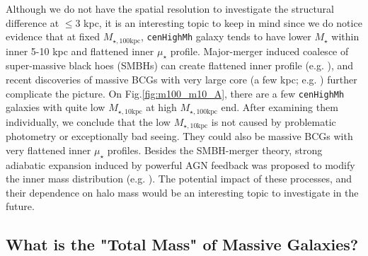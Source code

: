 \documentclass{emulateapj}
\def\rbcg{\texttt{cenHighMh}}
\def\mstar{{$M_{\star}$}}
\def\minn{{$M_{\star,10\mathrm{kpc}}$}}
\def\mtot{{$M_{\star,100\mathrm{kpc}}$}}
\def\mden{{$\mu_{\star}$}}
\newcommand{\update}[1]{\textcolor{Bittersweet}{#1}}
\begin{document}
\begin{CJK*}{UTF8}{gbsn}
    \update{
    Although we do not have the spatial resolution to investigate the structural 
    difference at $\leq 3$ kpc, it is an interesting topic to keep in mind since we do 
    notice evidence that at fixed \mtot{}, \rbcg{} galaxy tends to have lower \mstar{} 
    within inner 5-10 kpc and flattened inner \mden{} profile. 
    }
    Major-merger induced coalesce of super-massive black hoes (SMBHs) can create flattened 
    inner profile (e.g. \citealt{Milosavljevi2002}), and recent discoveries of massive 
    BCGs with very large core (a few kpc; e.g. \citealt{Postman2012, LopezCruz2014}) 
    further complicate the picture.
    On Fig.\ref{fig:m100_m10_A}, there are a few \rbcg{} galaxies with quite low 
    \minn{} at high \mtot{} end. 
    After examining them individually, we conclude that the low \minn{} is not caused 
    by problematic photometry or exceptionally bad seeing. 
    They could also be massive BCGs with very flattened inner \mden{} profiles.  
    Besides the SMBH-merger theory, strong adiabatic expansion induced by powerful AGN 
    feedback was proposed to modify the inner mass distribution (e.g. \citealt{Fan2008}). 
    The potential impact of these processes, and their dependence on halo mass would be 
    an interesting topic to investigate in the future.

 
\subsection{What is the "Total Mass" of Massive Galaxies?}
    

\end{CJK*}
\end{document}
